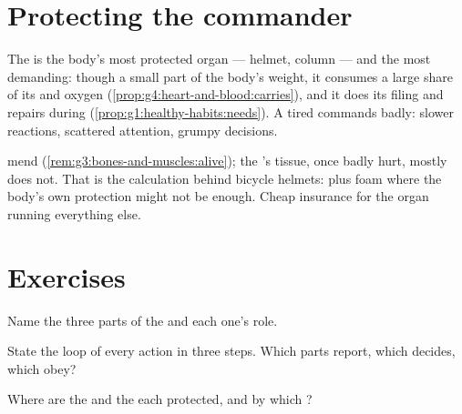 \section{Protecting the commander}

\begin{proposition}\label{prop:g5:brain-in-command:protect}
The  is the body's most protected organ --- 
helmet,  column --- and the most demanding: though a
small part of the body's weight, it consumes a large share
of its  and oxygen
(\cref{prop:g4:heart-and-blood:carries}), and it does its
filing and repairs during \emph{}
(\cref{prop:g1:healthy-habits:needs}). A tired 
commands badly: slower reactions, scattered attention,
grumpy decisions.
\end{proposition}
\admitted

\begin{example}\label{ex:g5:brain-in-command:helmet}
 mend (\cref{rem:g3:bones-and-muscles:alive}); the
's tissue, once badly hurt, mostly does not. That is
the calculation behind bicycle helmets:  plus foam
where the body's own protection might not be enough. Cheap
insurance for the organ running everything else.
\end{example}

\section{Exercises}

\begin{exercise}[$\star$]\label{exo:g5:brain-in-command:1}
Name the three parts of the  and each one's
role.
\end{exercise}

\begin{exercise}[$\star$]\label{exo:g5:brain-in-command:2}
State the loop of every action in three steps. Which parts
report, which decides, which obey?
\end{exercise}

\begin{exercise}[$\star$]\label{exo:g5:brain-in-command:3}
Where are the  and the  each protected, and
by which ?
\end{exercise}

